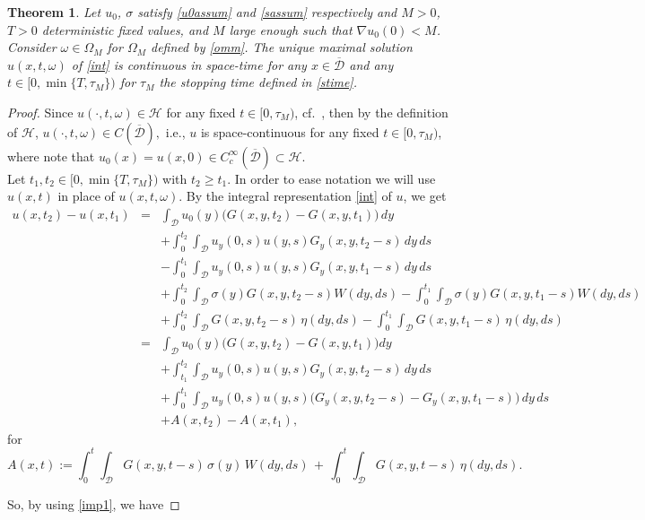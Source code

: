 \documentclass[reqno]{amsart}
\numberwithin{equation}{section}
\newtheorem{thm}{Theorem}[section]
\newcommand{\cd}{\mathcal{D}}
\begin{document}
\begin{thm}\label{thmcon}
Let $u_0$, $\sigma$ satisfy \eqref{u0assum} and \eqref{sassum}
respectively and $M>0$, $T>0$ deterministic fixed values, and $M$
large enough such that $\nabla u_0(0)<M$. Consider
$\omega\in\Omega_M$ for $\Omega_M$ defined by \eqref{omm}. The
unique maximal solution $u(x,t,\omega)$ of \eqref{int} is
continuous in space-time for any $x\in\overline{\mathcal{D}}$ and
any $t\in[0,\min\{T,\tau_M\})$ for $\tau_M$ the stopping
time defined in \eqref{stime}.
\end{thm}
\begin{proof}
Since $u(\cdot,t,\omega)\in\mathcal{H}$ for any fixed $t\in[0,\tau_M)$, cf.\ \cite{AFK2}, then by the definition of $\mathcal{H}$, $u(\cdot,t,\omega)\in C(\overline{\mathcal{D}}), $ i.e., $u$ is space-continuous for any fixed $t\in[0,\tau_M)$, where note that $u_0(x)=u(x,0)\in C_c^\infty(\overline{\mathcal{D}})\subset
\mathcal{H}$.\\
Let $t_1, t_2 \in [0,\min\{T,\tau_M\})$ with $t_2\geq t_1$.
In order to ease notation we will use $u(x,t)$ in place of
$u(x,t,\omega)$.
\allowdisplaybreaks
By the integral representation \eqref{int} of $u$, we get
\begin{eqnarray*}
u(x,t_2)-u(x,t_1)
&= &\int_{\cd}u_0(y)\big(G(x,y,t_2)-G(x,y,t_1)\big)\,dy\\
& &+\int_0^{t_2}\int_{\mathcal{D}}u_y(0,s)u(y,s)G_y(x,y,t_2-s)\,dy\,ds\\
& &-\int_0^{t_1}\int_{\mathcal{D}}u_y(0,s)u(y,s)G_y(x,y,t_1-s)\,dy\,ds\\
& & +\int_0^{t_2}\int_{\cd}\sigma(y)G(x,y,t_2-s)W(dy,ds)-\int_0^{t_1}\int_{\cd}\sigma(y)G(x,y,t_1-s)W(dy,ds)\\
& & +\int_0^{t_2}\int_{\cd}G(x,y,t_2-s)\,\eta(dy,ds)-\int_0^{t_1}\int_{\cd}G(x,y,t_1-s)\,\eta(dy,ds)\\
&=&\int_{\cd}u_0(y)\big(G(x,y,t_2)-G(x,y,t_1)\big)dy\\
& & +\int_{t_1}^{t_2}\int_{\mathcal{D}}u_y(0,s)u(y,s)G_y(x,y,t_2-s)\,dy\,ds\\
& & +\int_0^{t_1}\int_{\mathcal{D}}u_y(0,s)u(y,s)\bigl(G_y(x,y,t_2-s)-G_y(x,y,t_1-s)\bigr)\,dy\,ds\\
& & + A(x,t_2) - A(x,t_1),
\end{eqnarray*}
for
$$A(x,t):=\int_0^t\int_{\cd}G(x,y,t-s)\,\sigma(y)\,W(dy,ds)\,+\,\int_0^t\int_{\cd}G(x,y,t-s)\,\eta(dy,ds).$$

\noindent
So, by using \eqref{imp1}, we have 


\end{proof}
\end{document}
